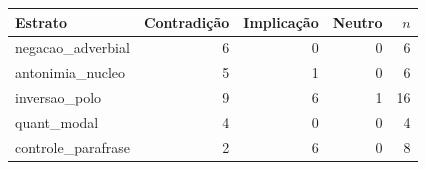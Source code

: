 \begin{tabular}{lrrrr}
\toprule
Estrato & Contradição & Implicação & Neutro & $n$ \\
\midrule
negacao\_adverbial & 6 & 0 & 0 & 6 \\
antonimia\_nucleo & 5 & 1 & 0 & 6 \\
inversao\_polo & 9 & 6 & 1 & 16 \\
quant\_modal & 4 & 0 & 0 & 4 \\
controle\_parafrase & 2 & 6 & 0 & 8 \\
\bottomrule
\end{tabular}
